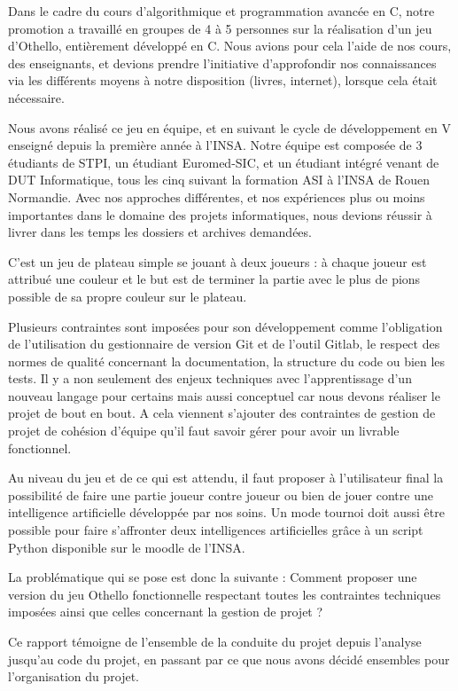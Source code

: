 \hspace{3em} Dans le cadre du cours d'algorithmique et programmation avancée en C, notre promotion a travaillé
en groupes de 4 à 5 personnes sur la réalisation d'un jeu d'Othello, entièrement développé en C.
Nous avions pour cela l'aide de nos cours, des enseignants, et devions prendre l'initiative d'approfondir
nos connaissances via les différents moyens à notre disposition (livres, internet), lorsque cela était nécessaire.

Nous avons réalisé ce jeu en équipe, et en suivant le cycle de développement en V enseigné depuis la première
 année à l'INSA. Notre équipe est composée de 3 étudiants de STPI, un étudiant Euromed-SIC, et un étudiant intégré
 venant de DUT Informatique, tous les cinq suivant la formation ASI à l'INSA de Rouen Normandie. Avec nos approches différentes,
 et nos expériences plus ou moins importantes dans le domaine des projets informatiques, nous devions réussir à livrer
 dans les temps les dossiers et archives demandées.

 C’est un jeu de plateau simple se jouant à deux joueurs : à chaque joueur est attribué une couleur et le but est de
 terminer la partie avec le plus de pions possible de sa propre couleur sur le plateau.

Plusieurs contraintes sont imposées pour son développement
comme l’obligation de l’utilisation du gestionnaire de version Git et de l’outil Gitlab, le respect des
normes de qualité concernant la documentation, la structure du code ou bien les tests. Il y a non seulement
des enjeux techniques avec l’apprentissage d’un nouveau langage pour certains mais aussi conceptuel car
 nous devons réaliser le projet de bout en bout.
 A cela viennent s’ajouter des contraintes de gestion de projet de cohésion d’équipe qu’il faut savoir
 gérer pour avoir un livrable fonctionnel.

Au niveau du jeu et de ce qui est attendu, il faut proposer à l’utilisateur final la possibilité de faire
une partie joueur contre joueur ou bien de jouer contre une intelligence artificielle développée par nos
soins. Un mode tournoi doit aussi être possible pour faire s’affronter deux intelligences artificielles
grâce à un script Python disponible sur le moodle de l’INSA.

La problématique qui se pose est donc la suivante : Comment proposer une version du jeu Othello fonctionnelle
respectant toutes les contraintes techniques imposées ainsi que celles concernant la gestion de projet ?

Ce rapport témoigne de l’ensemble de la conduite du projet depuis l’analyse jusqu’au code du projet,
en passant par ce que nous avons décidé ensembles pour l’organisation du projet.
